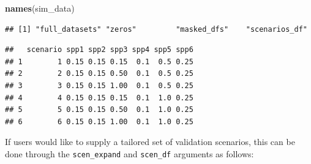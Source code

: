 \documentclass[
]{article}
\newenvironment{Shaded}{\begin{snugshade}}{\end{snugshade}}
\newcommand{\FunctionTok}[1]{\textcolor[rgb]{0.13,0.29,0.53}{\textbf{#1}}}
\newcommand{\NormalTok}[1]{#1}
\newcommand{\SpecialCharTok}[1]{\textcolor[rgb]{0.81,0.36,0.00}{\textbf{#1}}}
\begin{document}
\linespread{1}

\begin{Shaded}
\begin{Highlighting}[]
\FunctionTok{names}\NormalTok{(sim\_data)}
\end{Highlighting}
\end{Shaded}

\begin{verbatim}
## [1] "full_datasets" "zeros"         "masked_dfs"    "scenarios_df"
\end{verbatim}

\begin{Shaded}
\end{Shaded}

\begin{verbatim}
##   scenario spp1 spp2 spp3 spp4 spp5 spp6
## 1        1 0.15 0.15 0.15  0.1  0.5 0.25
## 2        2 0.15 0.15 0.50  0.1  0.5 0.25
## 3        3 0.15 0.15 1.00  0.1  0.5 0.25
## 4        4 0.15 0.15 0.15  0.1  1.0 0.25
## 5        5 0.15 0.15 0.50  0.1  1.0 0.25
## 6        6 0.15 0.15 1.00  0.1  1.0 0.25
\end{verbatim}

\linespread{1}

If users would like to supply a tailored set of validation scenarios, this can be done through the \texttt{scen\_expand} and \texttt{scen\_df} arguments as follows:

\linespread{1}
\end{document}
